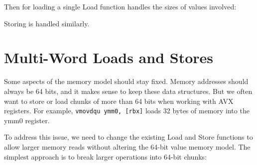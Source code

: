 \vspace{-5ex}

Then for loading a single Load function handles the sizes of values involved:


Storing is handled similarly.

\section{Multi-Word Loads and Stores}
\label{sec:multi-word}

Some aspects of the memory model should stay fixed.
Memory addresses should always be 64 bits, and it makes sense to keep these data structures.
But we often want to store or load chunks of more than 64 bits when working with AVX registers.
For example, \texttt{vmovdqu ymm0, [rbx]} loads 32 bytes of memory into the ymm0 register.

To address this issue, we need to change the existing Load and Store functions to allow larger memory reads without altering the 64-bit value memory model.
The simplest approach is to break larger operations into 64-bit chunks:

\vspace{-5ex}

